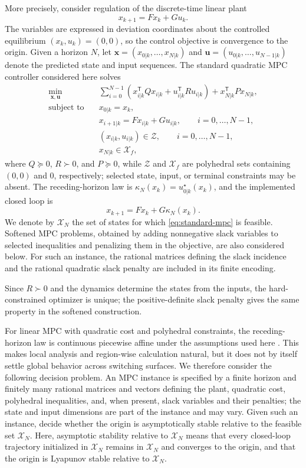 \documentclass{IEEEtran}
\theoremstyle{remark}
\begin{document}
More precisely, consider regulation of the discrete-time linear plant
\[
  x_{k+1}=F x_k+G u_k.
\]
The variables are expressed in deviation coordinates about the controlled equilibrium $(x_k,u_k)=(0,0)$, so the control objective is convergence to the origin.
Given a horizon $N$, let $\mathbf{x}=(x_{0|k},\ldots,x_{N|k})$ and
$\mathbf{u}=(u_{0|k},\ldots,u_{N-1|k})$ denote the predicted state and input
sequences.  The standard quadratic MPC controller considered here solves
\begin{subequations}
\label{eq:standard-mpc}
\begin{align}
\min_{\mathbf{x},\mathbf{u}}\quad&
\sum_{i=0}^{N-1}
\left(x_{i|k}^{\mathsf T}Qx_{i|k}
+u_{i|k}^{\mathsf T}Ru_{i|k}\right)
+x_{N|k}^{\mathsf T}Px_{N|k},\\
\text{subject to}\quad&
 x_{0|k}=x_k,\\
&x_{i+1|k}=Fx_{i|k}+Gu_{i|k},
\qquad i=0,\ldots,N-1,\\
&(x_{i|k},u_{i|k})\in\mathcal Z,
\qquad i=0,\ldots,N-1,\\
&x_{N|k}\in\mathcal X_f,
\end{align}
\end{subequations}
where $Q\succeq0$, $R\succ0$, and $P\succeq0$, while $\mathcal Z$ and $\mathcal X_f$ are polyhedral sets containing $(0,0)$ and $0$, respectively; selected state, input, or terminal constraints may be absent.  The receding-horizon law is $\kappa_N(x_k)=u_{0|k}^{\star}(x_k)$, and the implemented closed loop is
\[
  x_{k+1}=Fx_k+G\kappa_N(x_k).
\]
We denote by $\mathcal X_N$ the set of states for which \eqref{eq:standard-mpc} is feasible.  Softened MPC problems, obtained by adding nonnegative slack variables to selected inequalities and penalizing them in the objective, are also considered below.  For such an instance, the rational matrices defining the slack incidence and the rational quadratic slack penalty are included in its finite encoding.

Since $R\succ0$ and the dynamics determine the states from the inputs, the
hard-constrained optimizer is unique; the positive-definite slack penalty gives
the same property in the softened construction.

For linear MPC with quadratic cost and polyhedral constraints, the receding-horizon law is continuous piecewise affine under the assumptions used here \cite{BemporadEtAl2002}.  This makes local analysis and region-wise calculation natural, but it does not by itself settle global behavior across switching surfaces.  We therefore consider the following decision problem.  An MPC instance is specified by a finite horizon and finitely many rational matrices and vectors defining the plant, quadratic cost, polyhedral inequalities, and, when present, slack variables and their penalties; the state and input dimensions are part of the instance and may vary.  Given such an instance, decide whether the origin is asymptotically stable relative to the feasible set $\mathcal X_N$.  Here, asymptotic stability relative to $\mathcal X_N$ means that every closed-loop trajectory initialized in $\mathcal X_N$ remains in $\mathcal X_N$ and converges to the origin, and that the origin is Lyapunov stable relative to $\mathcal X_N$.
\end{document}
